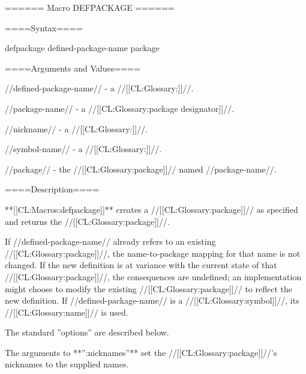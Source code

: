 ====== Macro DEFPACKAGE ======

====Syntax====

\DefmacWithValues defpackage {defined-package-name } {package}


====Arguments and Values====

//defined-package-name// - a //[[CL:Glossary:\packagenamedesignator]]//.

//package-name// - a //[[CL:Glossary:package designator]]//.

//nickname// - a //[[CL:Glossary:\packagenamedesignator]]//.

//symbol-name// - a //[[CL:Glossary:\symbolnamedesignator]]//.

//package// - the //[[CL:Glossary:package]]// named //package-name//.

====Description====

**[[CL:Macros:defpackage]]** creates a //[[CL:Glossary:package]]// as specified and returns the //[[CL:Glossary:package]]//.

If //defined-package-name// already refers to an existing //[[CL:Glossary:package]]//, the name-to-package mapping for that name is not changed. If the new definition is at variance with the current state of that //[[CL:Glossary:package]]//, the consequences are undefined; an implementation might choose to modify the existing //[[CL:Glossary:package]]// to reflect the new definition. If //defined-package-name// is a //[[CL:Glossary:symbol]]//, its //[[CL:Glossary:name]]// is used.

The standard ''options'' are described below.

\beginlist {}

The arguments to **'':nicknames''** set the //[[CL:Glossary:package]]//'s nicknames to the supplied names.




